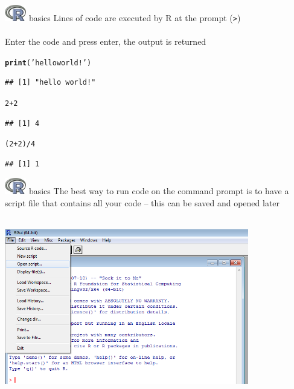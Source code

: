 \documentclass[xcolor=svgnames]{beamer}\usepackage[]{graphicx}\usepackage[]{color}
\makeatletter
\newcommand{\hlnum}[1]{\textcolor[rgb]{0.686,0.059,0.569}{#1}}%
\newcommand{\hlstr}[1]{\textcolor[rgb]{0.192,0.494,0.8}{#1}}%
\newcommand{\hlopt}[1]{\textcolor[rgb]{0,0,0}{#1}}%
\newcommand{\hlstd}[1]{\textcolor[rgb]{0.345,0.345,0.345}{#1}}%
\newcommand{\hlkwd}[1]{\textcolor[rgb]{0.737,0.353,0.396}{\textbf{#1}}}%
\newenvironment{kframe}{%
 \def\at@end@of@kframe{}%
 \ifinner\ifhmode%
  \def\at@end@of@kframe{\end{minipage}}%
  \begin{minipage}{\columnwidth}%
 \fi\fi%
 \def\FrameCommand##1{\hskip\@totalleftmargin \hskip-\fboxsep
 \colorbox{shadecolor}{##1}\hskip-\fboxsep
     \hskip-\linewidth \hskip-\@totalleftmargin \hskip\columnwidth}%
 \MakeFramed {\advance\hsize-\width
   \@totalleftmargin\z@ \linewidth\hsize
   \@setminipage}}%
 {\par\unskip\endMakeFramed%
 \at@end@of@kframe}
\newenvironment{knitrout}{}{} %
\makeatother
\begin{document}
\begin{frame}[fragile]{\includegraphics[width=0.07\textwidth]{Rlogo.jpg} \hspace{0.01in} basics}
Lines of code are executed by R at the prompt (\textit{\texttt{>}})\\~\\
Enter the code and press enter, the output is returned
\begin{knitrout}\scriptsize
{}\color{fgcolor}\begin{kframe}
\begin{alltt}
\hlkwd{print}\hlstd{(}\hlstr{'hello world!'}\hlstd{)}
\end{alltt}
\begin{verbatim}
## [1] "hello world!"
\end{verbatim}
\begin{alltt}
\hlnum{2} \hlopt{+} \hlnum{2}
\end{alltt}
\begin{verbatim}
## [1] 4
\end{verbatim}
\begin{alltt}
\hlstd{(}\hlnum{2} \hlopt{+} \hlnum{2}\hlstd{)} \hlopt{/} \hlnum{4}
\end{alltt}
\begin{verbatim}
## [1] 1
\end{verbatim}
\end{kframe}
\end{knitrout}
\end{frame}

\begin{frame}[fragile]{\includegraphics[width=0.07\textwidth]{Rlogo.jpg} \hspace{0.01in} basics}
The best way to run code on the command prompt is to have a script file that contains all your code -- this can be saved and opened later\\~\\
\centerline{\includegraphics[width = 0.8\textwidth]{openscript.png}}
\end{frame}
\end{document}
